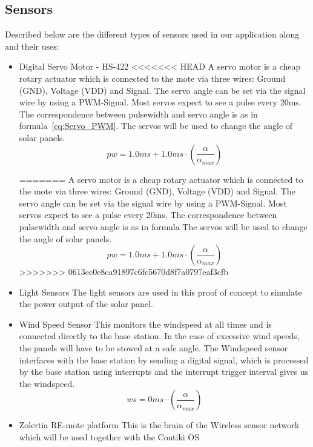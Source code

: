\documentclass[conference]{IEEEtran}
\begin{document}
\subsection{Sensors}
Described below are the different types of sensors used in our application along and their uses:

\begin{itemize}
    \item Digital Servo Motor - HS-422\cite{servoMotor}\newline
<<<<<<< HEAD
        A servo motor is a cheap rotary actuator which is connected to the mote via three wires: Ground (GND), Voltage (VDD) and Signal. The servo angle can be set via the signal wire by using a PWM-Signal. Most servos expect to see a pulse every 20ms. The correspondence between pulsewidth and servo angle is as in formula~\ref{eq:Servo_PWM}. The servos will be used to change the angle of solar panels.
\begin{equation}\label{eq:Servo_PWM}
pw = 1.0ms + 1.0ms \cdot (\frac{\alpha}{\alpha_{max}})
\end{equation}
        
        
=======
        A servo motor is a cheap rotary actuator which is connected to the mote via three wires: Ground (GND), Voltage (VDD) and Signal. The servo angle can be set via the signal wire by using a PWM-Signal. Most servos expect to see a pulse every 20ms. The correspondence between pulsewidth and servo angle is as in formula The servos will be used to change the angle of solar panels.
        \begin{equation}\label{eq:Servo_PWM}
            pw = 1.0ms + 1.0ms \cdot (\frac{\alpha}{\alpha_{max}})
        \end{equation}
>>>>>>> 0613ec0e8ca91897c6fc5670d8f7a0797eaf3cfb
    \item Light Sensors\cite{LightSensor}\newline
        The light sensors are used in this proof of concept to simulate the power output of the solar panel.
    \item Wind Speed Sensor\cite{WindSensor}\newline
        This monitors the windspeed at all times and is connected directly to the base station. In the case of excessive wind speeds, the panels will have to be stowed at a safe angle.\newline
        The Windspeed sensor interfaces with the base station by sending a digital signal, which is processed by the base station using interrupts and the interrupt trigger interval gives us the windspeed.
        \begin{equation}\label{eq:WindSpeed}
            ws = 0ms \cdot (\frac{\alpha}{\alpha_{max}})
        \end{equation}
    \item Zolertia RE-mote platform\cite{REmote}\newline
        This is the brain of the Wireless sensor network which will be used together with the Contiki OS

\end{itemize}
\end{document}
